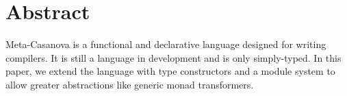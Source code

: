 \section*{Abstract}
Meta-Casanova is a functional and declarative language designed for writing compilers. 
It is still a language in development and is only simply-typed.
In this paper, we extend the language with type constructors and a module system to allow greater abstractions like generic monad transformers.
